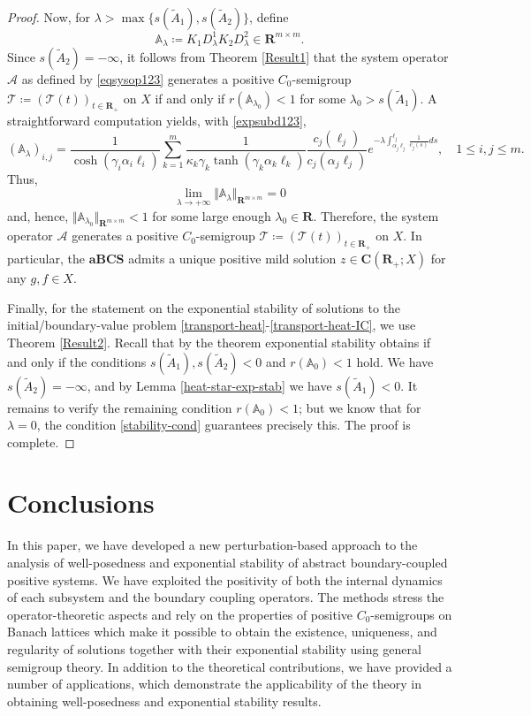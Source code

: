 \documentclass[a4paper,11pt,reqno]{amsart}
\def\A{{\mathbb{A}}}
\def\la{\lambda}
\def\calT{{\mathcal{T}}}
\def\R{\mathbf{R}}
\theoremstyle{plain}
\numberwithin{equation}{section}
\begin{document}
\begin{proof}
Now, for $\lambda>\max\{s(\tilde{A}_1),s(\tilde{A}_2)\}$, define
\begin{equation*}
\A_\la\coloneqq K_1 D_\lambda^1 K_2 D_\lambda^2\in \R^{m\times m}.
\end{equation*}
Since $s(\tilde{A}_2)=-\infty$, it follows from Theorem \ref{Result1} that the system operator $\mathcal{A}$ as defined by \eqref{eqsysop123} generates a positive $C_0$-semigroup $\calT\coloneqq (\calT(t))_{t\in\R_+}$ on $X$ if and only if $r(\A_{\lambda_0})<1$ for some $\lambda_0>s(\tilde{A}_1)$. A straightforward computation yields, with \eqref{expsubd123},
\begin{equation*}
(\A_\la)_{i,j} =\frac{1}{\cosh(\gamma_i \alpha_i\ell_i)} \sum_{k=1}^m \frac{1}{\kappa_k \gamma_k \tanh(\gamma_k \alpha_k \ell_k)} \frac{c_j(\ell_j)}{c_j(\alpha_j \ell_j)} e^{-\la \int_{\alpha_j \ell_j}^{\ell_j} \frac{1}{c_j(s)} ds},\quad 1 \le i,j\le m.
\end{equation*}
Thus,
\begin{equation*}
\lim_{\la \to +\infty}\Vert \A_\lambda\Vert_{\R^{m\times m}}=0
\end{equation*}
and, hence, $\Vert \A_{\lambda_0}\Vert_{\R^{m\times m}}<1$ for some large enough $\lambda_0\in \R$. Therefore, the system operator $\mathcal{A}$ generates a positive $C_0$-semigroup $\calT\coloneqq (\calT(t))_{t\in\R_+}$ on $X$. In particular, the $\mathbf{aBCS}$ admits a unique positive mild solution $z\in \bm{C}(\R_+;X)$ for any $g,f\in X$.

Finally, for the statement on the exponential stability of solutions to the initial/boundary-value problem \eqref{transport-heat}-\eqref{transport-heat-IC}, we use Theorem \ref{Result2}. Recall that by the theorem exponential stability obtains if and only if the conditions $s(\tilde{A}_1),s(\tilde{A}_2)<0$ and $r(\A_0)<1$ hold. We have $s(\tilde{A}_2)=-\infty$, and by Lemma \ref{heat-star-exp-stab} we have $s(\tilde{A}_1)<0$. It remains to verify the remaining condition $r(\A_0)<1$; but we know that for $\lambda=0$, the condition \eqref{stability-cond} guarantees precisely this. The proof is complete.
\end{proof}

\section{Conclusions}\label{Sec:4}

In this paper, we have developed a new perturbation-based approach to the analysis of well-posedness and exponential stability of abstract boundary-coupled positive systems. We have exploited the positivity of both the internal dynamics of each subsystem and the boundary coupling operators. The methods stress the operator-theoretic aspects and rely on the properties of positive $C_0$-semigroups on Banach lattices which make it possible to obtain the existence, uniqueness, and regularity of solutions together with their exponential stability using general semigroup theory. In addition to the theoretical contributions, we have provided a number of applications, which demonstrate the applicability of the theory in obtaining well-posedness and exponential stability results.
\end{document}

